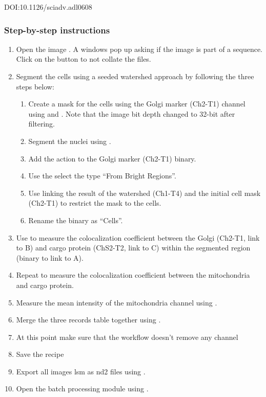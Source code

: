 DOI:10.1126/sciadv.adl0608

\subsubsection*{Step-by-step instructions}
\begin{enumerate}
    \item Open the image . A windows pop up asking if the image is part of a sequence. Click on the  button to not collate the files.
    \item Segment the cells using a seeded watershed approach by following the three steps below:
    \begin{enumerate}
        \item Create a mask for the cells using the Golgi marker (Ch2-T1) channel using  and 
        . 
        Note that the image bit depth changed to 32-bit after filtering.
        \item Segment the nuclei using 
        .
        \item Add the action  to the Golgi marker (Ch2-T1) binary. 
        \item Use the  select the type ``From Bright Regions''. 
        \item Use  linking the result of the watershed (Ch1-T4) and the initial cell mask (Ch2-T1) to restrict the mask to the cells.
        \item Rename the binary as ``Cells''.
    \end{enumerate}
    \item Use  to measure the colocalization coefficient between the Golgi (Ch2-T1, link to B) and cargo protein (ChS2-T2, link to C) within the segmented region (binary to link to A). 
    \item Repeat to measure the colocalization coefficient between the mitochondria and cargo protein.
    \item Measure the mean intensity of the mitochondria channel using .
    \item Merge the three records table together using .
    \item At this point make sure that the workflow doesn't remove any channel
    \item Save the recipe
    \item Export all images lsm as nd2 files using .
    \item Open the batch processing module using .
\end{enumerate}
